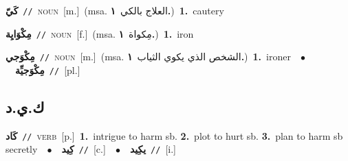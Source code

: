 \documentclass[10pt,a4paper,twoside]{article} %
\begin{document}
\begin{multicols}{2}
{\setlength\topsep{0pt}\textbf{\foreignlanguage{arabic}{كَيّ}}\ {\color{gray}\texttt{//}\color{black}}\ \textsc{noun}\ [m.]\ \color{gray}(msa. \foreignlanguage{arabic}{العلاج بالكي}~\foreignlanguage{arabic}{\textbf{١.}})\color{black}\ \textbf{1.}~cautery\ } \vspace{2mm}

{\setlength\topsep{0pt}\textbf{\foreignlanguage{arabic}{مِكْوَايِة}}\ {\color{gray}\texttt{//}\color{black}}\ \textsc{noun}\ [f.]\ \color{gray}(msa. \foreignlanguage{arabic}{مِكواة}~\foreignlanguage{arabic}{\textbf{١.}})\color{black}\ \textbf{1.}~iron\ } \vspace{2mm}

{\setlength\topsep{0pt}\textbf{\foreignlanguage{arabic}{مِكْوَجي}}\ {\color{gray}\texttt{//}\color{black}}\ \textsc{noun}\ [m.]\ \color{gray}(msa. \foreignlanguage{arabic}{الشخص الذي يكوي الثياب}~\foreignlanguage{arabic}{\textbf{١.}})\color{black}\ \textbf{1.}~ironer\ \ $\bullet$\ \ \setlength\topsep{0pt}\textbf{\foreignlanguage{arabic}{مِكْوَجيِّة}}\ {\color{gray}\texttt{//}\color{black}}\ [pl.]\ } \vspace{2mm}

\vspace{-3mm}
\subsection*{\color{blue}\foreignlanguage{arabic}{ك.ي.د}\color{blue}{}} 

{\setlength\topsep{0pt}\textbf{\foreignlanguage{arabic}{كَاد}}\ {\color{gray}\texttt{//}\color{black}}\ \textsc{verb}\ [p.]\ \textbf{1.}~intrigue to harm sb.  \textbf{2.}~plot to hurt sb.  \textbf{3.}~plan to harm sb secretly\ \ $\bullet$\ \ \setlength\topsep{0pt}\textbf{\foreignlanguage{arabic}{كِيد}}\ {\color{gray}\texttt{//}\color{black}}\ [c.]\ \ $\bullet$\ \ \setlength\topsep{0pt}\textbf{\foreignlanguage{arabic}{يكِيد}}\ {\color{gray}\texttt{//}\color{black}}\ [i.]\ } \vspace{2mm}


\end{multicols}
\end{document}
